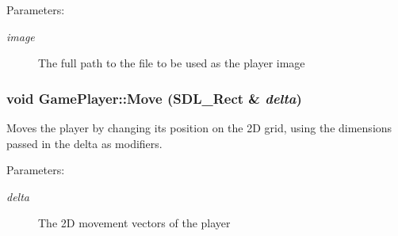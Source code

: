 \begin{Desc}
\item[Parameters:]
\begin{description}
\item[{\em image}]The full path to the file to be used as the player image \end{description}
\end{Desc}
\hypertarget{class_game_player_df2b0a348192c421edcc94b3ca1cc3d6}{
\subsubsection[{Move}]{\setlength{\rightskip}{0pt plus 5cm}void GamePlayer::Move (SDL\_\-Rect \& {\em delta})}}
\label{d7/df6/class_game_player_df2b0a348192c421edcc94b3ca1cc3d6}


Moves the player by changing its position on the 2D grid, using the dimensions passed in the delta as modifiers.

\begin{Desc}
\item[Parameters:]
\begin{description}
\item[{\em delta}]The 2D movement vectors of the player \end{description}
\end{Desc}
